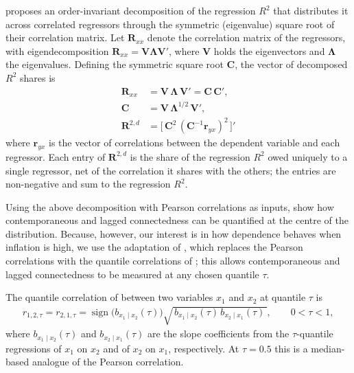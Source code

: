 \documentclass{article}
\begin{document}
\textcite{genizi1993} proposes an order-invariant decomposition of the regression
$R^2$ that distributes it across correlated regressors through the symmetric
(eigenvalue) square root of their correlation matrix. Let $\bm{R}_{xx}$ denote
the correlation matrix of the regressors, with eigendecomposition
$\bm{R}_{xx}=\bm{V}\bm{\Lambda}\bm{V}'$, where $\bm{V}$ holds the eigenvectors and
$\bm{\Lambda}$ the eigenvalues. Defining the symmetric square root $\bm{C}$, the
vector of decomposed $R^2$ shares is
\begin{align}
\bm{R}_{xx} &= \bm{V}\,\bm{\Lambda}\,\bm{V}' = \bm{C}\,\bm{C}', \label{eq:rxx}\\
\bm{C}      &= \bm{V}\,\bm{\Lambda}^{1/2}\,\bm{V}', \label{eq:C}\\
\bm{R}^{2,d} &= \bigl[\,\bm{C}^2\,(\bm{C}^{-1}\bm{r}_{yx})^2\,\bigr]' 
  \label{eq:r2d}
\end{align}
where $\bm{r}_{yx}$ is the vector of correlations between the dependent variable
and each regressor. Each entry of $\bm{R}^{2,d}$ is the share of the regression $R^2$ owed
uniquely to a single regressor, net of the correlation it shares with the others; the entries are
non-negative and sum to the regression $R^2$.

 Using the above decomposition with Pearson correlations as inputs, \textcite{balli2023} show how contemporaneous and lagged connectedness can be quantified at the centre of the distribution. Because, however, our interest is in how dependence behaves when inflation is high, we use the adaptation of \textcite{shahzadetal}, which replaces the Pearson correlations with the quantile correlations of \textcite{choishin2022}; this allows contemporaneous and lagged connectedness to be measured at any chosen quantile $\tau$.

The quantile correlation of \textcite{choishin2022} between two variables $x_1$ and
$x_2$ at quantile $\tau$ is
\begin{align}
r_{1,2,\tau}=r_{2,1,\tau}
  =\operatorname{sign}\!\big(b_{x_1\mid x_2}(\tau)\big)
   \sqrt{\,b_{x_1\mid x_2}(\tau)\,b_{x_2\mid x_1}(\tau)\,},
  \qquad 0<\tau<1,
\end{align}
where $b_{x_1\mid x_2}(\tau)$ and $b_{x_2\mid x_1}(\tau)$ are the slope coefficients from
the $\tau$-quantile regressions of $x_1$ on $x_2$ and of $x_2$ on $x_1$, respectively. At
$\tau=0.5$ this is a median-based analogue of the Pearson correlation.
\end{document}
